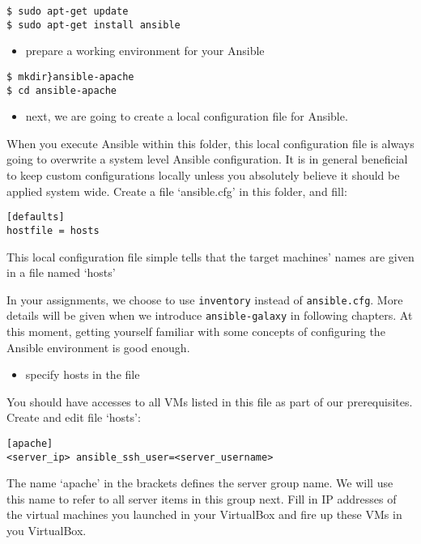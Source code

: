 \begin{lstlisting}
$ sudo apt-get update
$ sudo apt-get install ansible
\end{lstlisting}

\begin{itemize}
\tightlist
\item
  prepare a working environment for your Ansible
\end{itemize}

\begin{lstlisting}
$ mkdir}ansible-apache
$ cd ansible-apache
\end{lstlisting}

\begin{itemize}
\tightlist
\item
  next, we are going to create a local configuration file for Ansible.
\end{itemize}

When you execute Ansible within this folder, this local configuration
file is always going to overwrite a system level Ansible configuration.
It is in general beneficial to keep custom configurations locally unless
you absolutely believe it should be applied system wide. Create a file
`ansible.cfg' in this folder, and fill:

\begin{verbatim}
[defaults]
hostfile = hosts
\end{verbatim}

This local configuration file simple tells that the target machines'
names are given in a file named `hosts'

In your assignments, we choose to use \texttt{inventory} instead of
\texttt{ansible.cfg}. More details will be given when we introduce
\texttt{ansible-galaxy} in following chapters. At this moment, getting
yourself familiar with some concepts of configuring the Ansible
environment is good enough.

\begin{itemize}
\tightlist
\item
  specify hosts in the file
\end{itemize}

You should have accesses to all VMs listed in this file as part of our
prerequisites. Create and edit file `hosts':

\begin{verbatim}
[apache]
<server_ip> ansible_ssh_user=<server_username>
\end{verbatim}

The name `apache' in the brackets defines the server group name. We will
use this name to refer to all server items in this group next. Fill in
IP addresses of the virtual machines you launched in your VirtualBox and
fire up these VMs in you VirtualBox.

